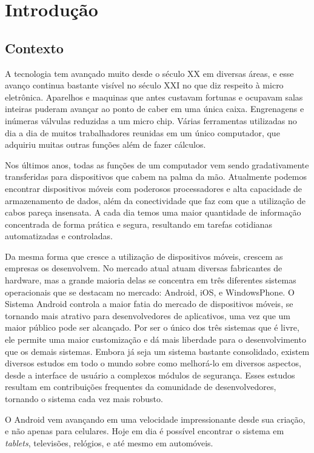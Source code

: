 \chapter{Introdução}
\section{Contexto}
A tecnologia tem avançado muito desde o século XX em diversas áreas, e esse avanço continua bastante visível no século XXI no que diz respeito à micro eletrônica. Aparelhos e maquinas que antes custavam fortunas e ocupavam salas inteiras puderam avançar ao ponto de caber em uma única caixa. Engrenagens e inúmeras válvulas reduzidas a um micro chip. Várias ferramentas utilizadas no dia a dia de muitos trabalhadores reunidas em um único computador, que adquiriu muitas outras funções além de fazer cálculos.

Nos últimos anos, todas as funções de um computador vem sendo gradativamente transferidas para dispositivos que cabem na palma da mão. Atualmente podemos encontrar dispositivos móveis com poderosos processadores e alta capacidade de armazenamento de dados, além da conectividade que faz com que a utilização de cabos pareça insensata. A cada dia temos uma maior quantidade de informação concentrada de forma prática e segura, resultando em tarefas cotidianas automatizadas e controladas.

Da mesma forma que cresce a utilização de dispositivos móveis, crescem as empresas os desenvolvem. No mercado atual atuam diversas fabricantes de hardware, mas a grande maioria delas se concentra em três diferentes sistemas operacionais que se destacam no mercado: Android, iOS, e WindowsPhone. O Sistema Android controla a maior fatia do mercado de dispositivos móveis, se tornando mais atrativo para desenvolvedores de aplicativos, uma vez que um maior público pode ser alcançado. Por ser o único dos três sistemas que é livre, ele permite uma maior customização e dá mais liberdade para o desenvolvimento que os demais sistemas. Embora já seja um sistema bastante consolidado, existem diversos estudos em todo o mundo sobre como melhorá-lo em diversos aspectos, desde a interface de usuário a complexos módulos de segurança. Esses estudos resultam em contribuições frequentes da comunidade de desenvolvedores, tornando o sistema cada vez mais robusto.

O Android vem avançando em uma velocidade impressionante desde sua criação, e não apenas para celulares. Hoje em dia é possível encontrar o sistema em \textit{tablets}, televisões, relógios, e até mesmo em automóveis.

